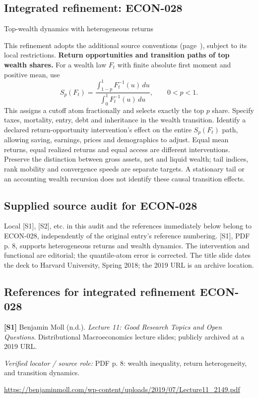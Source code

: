 \documentclass[11pt,a4paper]{article}
\begin{document}
\subsection*{Integrated refinement: ECON-028}
{\sffamily\small\color{muted}Top-wealth dynamics with heterogeneous returns\par}
This refinement adopts the additional source conventions
(page~\pageref{audited:conventions}), subject to its local restrictions.
\textbf{Return opportunities and transition paths of top wealth shares.}
For a wealth law $F_t$ with finite absolute first moment and positive mean, use
\[
S_p(F_t)=\frac{\int_{1-p}^{1}F_t^{-1}(u)\,du}
                   {\int_0^1F_t^{-1}(u)\,du},\qquad 0<p<1.
\]
This assigns a cutoff atom fractionally and selects exactly the top $p$ share.
Specify taxes, mortality, entry, debt and inheritance in the wealth transition.
Identify a declared return-opportunity intervention's effect on the entire
$S_p(F_t)$ path, allowing saving, earnings, prices and demographics to adjust.
Equal mean returns, equal realized returns and equal access are different
interventions. Preserve the distinction between gross assets, net and liquid
wealth; tail indices, rank mobility and convergence speeds are separate targets.
A stationary tail or an accounting wealth recursion does not identify these
causal transition effects.
\subsection*{Supplied source audit for ECON-028}
Local [S1], [S2], etc. in this audit and the references immediately below
belong to ECON-028, independently of the original entry's reference numbering.
[S1], PDF p. 8, supports heterogeneous returns and wealth dynamics. The intervention and functional are editorial; the quantile-atom error is corrected. The title slide dates the deck to Harvard University, Spring 2018; the 2019 URL is an archive location.
\subsection*{References for integrated refinement ECON-028}
{\footnotesize\raggedright
\par\noindent\textbf{[S1]} Benjamin Moll (n.d.). \emph{Lecture 11: Good Research Topics and Open Questions}. Distributional Macroeconomics lecture slides; publicly archived at a 2019 URL.\par \textit{Verified locator / source role:} PDF p. 8: wealth inequality, return heterogeneity, and transition dynamics.\par \url{https://benjaminmoll.com/wp-content/uploads/2019/07/Lecture11_2149.pdf}\par\smallskip
}
\end{document}
